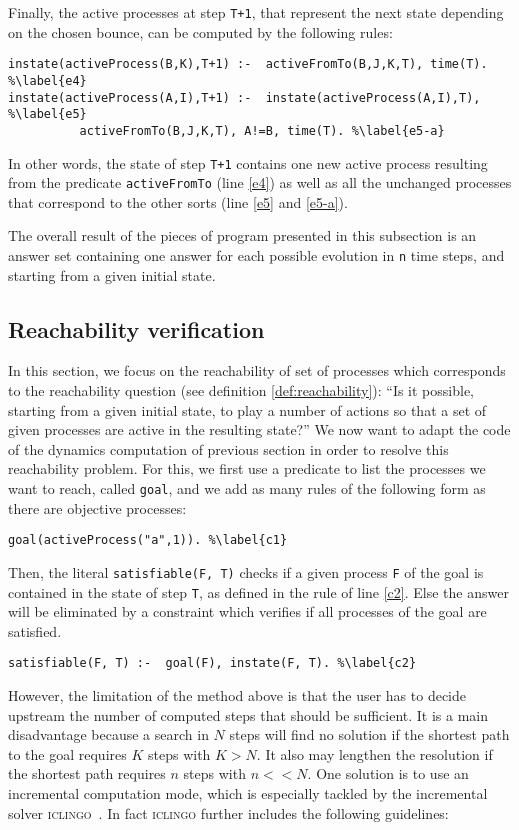 Finally, the active processes at step \texttt{T+1},
that represent the next state depending on the chosen bounce,
can be computed by the following rules:
\begin{lstlisting}
instate(activeProcess(B,K),T+1) :-  activeFromTo(B,J,K,T), time(T). %\label{e4}
instate(activeProcess(A,I),T+1) :-  instate(activeProcess(A,I),T), %\label{e5}
          activeFromTo(B,J,K,T), A!=B, time(T). %\label{e5-a}
\end{lstlisting}
In other words, the state of step \texttt{T+1} contains one new active process
resulting from the predicate \texttt{activeFromTo} (line \ref{e4})
as well as all the unchanged processes that correspond to the other sorts (line \ref{e5} and \ref{e5-a}).

The overall result of the pieces of program presented in this subsection
is an answer set containing one answer for each
possible evolution in \texttt{n} time steps,
and starting from a given initial state.

\subsection{Reachability verification}
In this section, we focus on the reachability of set of processes which corresponds to the reachability question (see definition \ref{def:reachability}):
“Is it possible, starting from a given initial state, to play a number of actions so that a set of given processes are active in the resulting state?”
We now want to adapt the code of the dynamics computation of previous section in order to resolve this reachability problem.
For this, we first use a predicate to list the processes we want to reach, called \texttt{goal}, and we add as many rules of the following form as there are objective processes:
\begin{lstlisting}
goal(activeProcess("a",1)). %\label{c1}
\end{lstlisting}
Then, the literal \texttt{satisfiable(F, T)} 
checks if a given process \texttt{F} of the goal
is contained in the state of step \texttt{T},
as defined in the rule of line \ref{c2}.
Else the answer will be eliminated by a constraint which verifies if all processes of the goal are satisfied.
\begin{lstlisting}
satisfiable(F, T) :-  goal(F), instate(F, T). %\label{c2}
\end{lstlisting}

However, the limitation of the method above is that the user has to decide upstream
the number of computed steps that should be sufficient.
It is a main disadvantage because a search in $N$ steps will find no solution
if the shortest path to the goal requires $K$ steps with $K > N$. It also may lengthen the resolution if the shortest path requires $n$ steps with $n << N$.
One solution is to use an incremental computation mode,
which is especially tackled by the incremental solver \textsc{iclingo}~\cite{gebser2008user}. In fact \textsc{iclingo} further includes the following guidelines:

